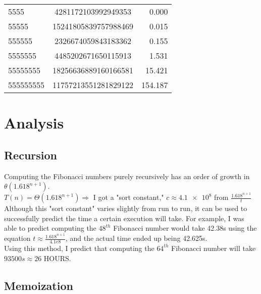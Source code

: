 \documentclass{article}
\begin{document}
\begin{center}
\begin{tabular}{ | l | c | r | }
	5555 & 4281172103992949353 & 0.000 \\ 
	55555 & 15241805839757988469 & 0.015 \\ 
	555555 & 2326674059843183362 & 0.155 \\ 
	5555555 & 4485202671650115913 & 1.531 \\ 
	55555555 & 18256636889160166581 & 15.421 \\ 
	555555555 & 11757213551281829122 & 154.187 \\ 

	\hline

\end{tabular}
\end{center}

\newpage


\section{Analysis}


\subsection{Recursion}

\hspace{1em} Computing the Fibonacci numbers purely recursively has an order of growth in $\theta (1.618^{n+1})$. \\

	$T(n) = \Theta (1.618^{n+1}) \Rightarrow$ I got a "sort constant," $c \approx \num{4.1e8}$ from $\frac{1.618^{n+1}}{t}$ \\

Although this "sort constant" varies slightly from run to run, it can be used to successfully predict the time a certain
execution will take. For example, I was able to predict computing the $48^{th}$ Fibonacci number would take 42.38s using
the equation $t \approx \frac{1.618^{n+1}}{4.1e8}$, and the actual time ended up being 42.625s. \\

Using this method, I predict that computing the $64^{th}$ Fibonacci number will take $93500s \approx 26$ HOURS.




\subsection{Memoization}
\end{document}
